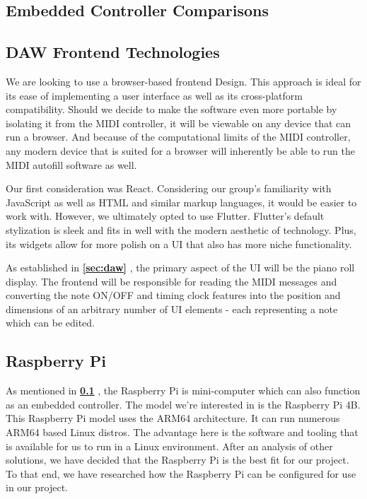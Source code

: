 \blindtext

\subsection{Embedded Controller Comparisons}
\label{sec:embedded_controllers}

\blindtext

\subsection{DAW Frontend Technologies}

We are looking to use a browser-based frontend Design. This approach is ideal for its ease of
implementing a user interface as well as its cross-platform compatibility. Should we decide to
make the software even more portable by isolating it from the MIDI controller, it will be viewable
on any device that can run a browser. And because of the computational limits of the MIDI
controller, any modern device that is suited for a browser will inherently be able to run the
MIDI autofill software as well.

Our first consideration was React. Considering our group's familiarity with JavaScript as well as
HTML and similar markup languages, it would be easier to work with. However, we ultimately opted to
use Flutter. Flutter's default stylization is sleek and fits in well with the modern aesthetic of
technology. Plus, its widgets allow for more polish on a UI that also has more niche functionality.

As established in \textbf{\ref{sec:daw} }, the primary aspect of the UI will be the piano roll display.
The frontend will be responsible for reading the MIDI messages and converting the note ON/OFF and
timing clock features into the position and dimensions of an arbitrary number of UI elements -
each representing a note which can be edited.

\subsection{Raspberry Pi}

As mentioned in \textbf{\ref{sec:embedded_controllers} }, the Raspberry Pi is mini-computer
which can also function as an embedded controller. The model we're interested in is the
Raspberry Pi 4B. This Raspberry Pi model uses the ARM64 architecture. It can run numerous
ARM64 based Linux distros. The advantage here is the software and tooling that is
available for us to run in a Linux environment. After an analysis of other solutions, we
have decided that the Raspberry Pi is the best fit for our project. To that end, we have
researched how the Raspberry Pi can be configured for use in our project.

